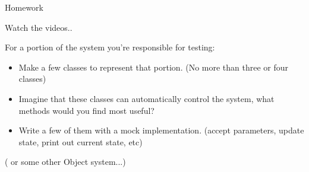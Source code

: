 \documentclass{beamer}
\begin{document}
\begin{frame}[fragile]{Homework}

{\Large Watch the videos..}

\vfill
{\Large For a portion of the system you're responsible for testing:}
\begin{itemize}
  \item Make a few classes to represent that portion. (No more than three or
        four classes)
  \item Imagine that these classes can automatically control the system, what
        methods would you find most useful?
  \item Write a few of them with a mock implementation. (accept parameters,
        update state, print out current state, etc)
\end{itemize}

\vfill
( or some other Object system...)
\end{frame}
\end{document}
